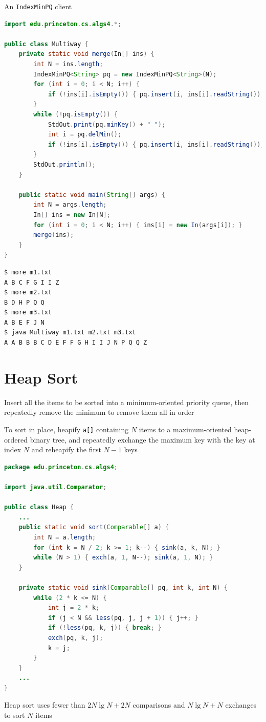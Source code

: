 \documentclass[8pt,a4paper,compress]{beamer}
\begin{document}
\begin{frame}[fragile]
An \lstinline{IndexMinPQ} client
\begin{lstlisting}[language=Java]
import edu.princeton.cs.algs4.*;

public class Multiway { 
    private static void merge(In[] ins) { 
        int N = ins.length; 
        IndexMinPQ<String> pq = new IndexMinPQ<String>(N); 
        for (int i = 0; i < N; i++) { 
            if (!ins[i].isEmpty()) { pq.insert(i, ins[i].readString()); }
        } 
        while (!pq.isEmpty()) {
            StdOut.print(pq.minKey() + " "); 
            int i = pq.delMin(); 
            if (!ins[i].isEmpty()) { pq.insert(i, ins[i].readString()); }
        }
        StdOut.println();
    } 

    public static void main(String[] args) { 
        int N = args.length; 
        In[] ins = new In[N]; 
        for (int i = 0; i < N; i++) { ins[i] = new In(args[i]); } 
        merge(ins); 
    } 
} 
\end{lstlisting}

\begin{lstlisting}[language={}]
$ more m1.txt 
A B C F G I I Z
$ more m2.txt 
B D H P Q Q
$ more m3.txt 
A B E F J N
$ java Multiway m1.txt m2.txt m3.txt 
A A B B B C D E F F G H I I J N P Q Q Z 
\end{lstlisting}
\end{frame}

\section{Heap Sort}
\begin{frame}[fragile]
Insert all the items to be sorted into a minimum-oriented priority queue, then repeatedly remove the minimum to remove them all in order

\bigskip

To sort in place, heapify \lstinline$a[]$ containing $N$ items to a maximum-oriented heap-ordered binary tree, and repeatedly exchange the maximum key with the key at index $N$ and reheapify the first $N - 1$ keys 

\begin{lstlisting}[language=Java]
package edu.princeton.cs.algs4;

import java.util.Comparator;

public class Heap {
    ...
    public static void sort(Comparable[] a) {
        int N = a.length;
        for (int k = N / 2; k >= 1; k--) { sink(a, k, N); }
        while (N > 1) { exch(a, 1, N--); sink(a, 1, N); }
    }
    
    private static void sink(Comparable[] pq, int k, int N) {
        while (2 * k <= N) {
            int j = 2 * k;
            if (j < N && less(pq, j, j + 1)) { j++; }
            if (!less(pq, k, j)) { break; }
            exch(pq, k, j);
            k = j;
        }
    }
    ...
}
\end{lstlisting}

\bigskip

Heap sort uses fewer than $2N \lg N + 2N$ comparisons and $N\lg N + N$ exchanges to sort $N$ items
\end{frame}
\end{document}
